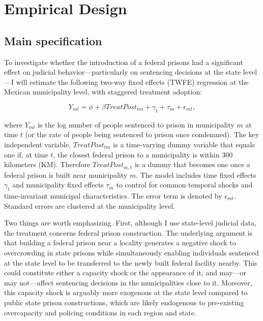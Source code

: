 \section{Empirical Design}
\label{sec:emp}

\subsection*{Main specification}

To investigate whether the introduction of a federal prisons had a significant effect on judicial behavior—particularly on sentencing decisions at the state level—I will estimate the following two-way fixed effects (TWFE) regression at the Mexican municipality level, with staggered treatment adoption:

\begin{equation}
\label{eq:eq1}
    Y_{mt} = \phi + \beta TreatPost_{tm} + \gamma_t + \tau_m + \epsilon_{mt},
\end{equation}

where $Y_{mt}$ is the log number of people sentenced to prison in municipality $m$ at time $t$ (or the rate of people being sentenced to prison once condemned). The key independent variable, $TreatPost_{tm}$ is a time-varying dummy variable that equals one if, at time $t$, the closest federal prison to a municipality is within 300 kilometers (KM). Therefore $TreatPost_{m, t}$ is a dummy that becomes one once a federal prison is built near municipality $m$. The model includes time fixed effects $\gamma_t$ and municipality fixed effects $\tau_m$ to control for common temporal shocks and time-invariant municipal characteristics. The error term is denoted by $\epsilon_{mt}$. Standard errors are clustered at the municipality level.

 Two things are worth emphasizing. First, although I use state-level judicial data, the treatment concerns federal prison construction. The underlying argument is that building a federal prison near a locality generates a negative shock to overcrowding in state prisons while simultaneously enabling individuals sentenced at the state level to be transferred to the newly built federal facility nearby. This could constitute either a capacity shock or the appearance of it, and may—or may not—affect sentencing decisions in the municipalities close to it. Moreover, this capacity shock is arguably more exogenous at the state level compared to public state prison constructions, which are likely endogenous to pre-existing overcapacity and policing conditions in each region and state.

